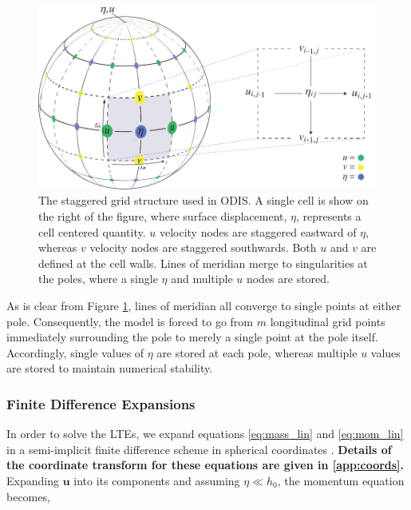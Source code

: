 \begin{figure}[t]
\centering
\includegraphics[width=0.8\linewidth]{Figures/GridDiagram_revision}
\caption{The staggered grid structure used in ODIS. A single cell is show on the right of the figure, where surface displacement, $\eta$, represents a cell centered quantity. $u$ velocity nodes are staggered eastward of $\eta$, whereas $v$ velocity nodes are staggered southwards. Both $u$ and $v$ are defined at the cell walls. Lines of meridian merge to singularities at the poles, where a single $\eta$ and multiple $u$ nodes are stored.\label{fig:grid}}
\end{figure}

As is clear from Figure \ref{fig:grid}, lines of meridian all converge to single points at either pole. Consequently, the model is forced to go from $m$ longitudinal grid points immediately surrounding the pole to merely a single point at the pole itself. Accordingly, single values of $\eta$ are stored at each pole, whereas multiple $u$ values are stored to maintain numerical stability. 


\subsubsection{Finite Difference Expansions \label{subsec:fd_expan}}

In order to solve the LTEs, we expand equations \ref{eq:mass_lin} and \ref{eq:mom_lin} in a semi-implicit finite difference scheme in spherical coordinates \citep{sears1995tidal}. \textbf{Details of the coordinate transform for these equations are given in \ref{app:coords}.} Expanding $\bm{u}$ into its components and assuming $\eta \ll h_0$, the momentum equation becomes,

